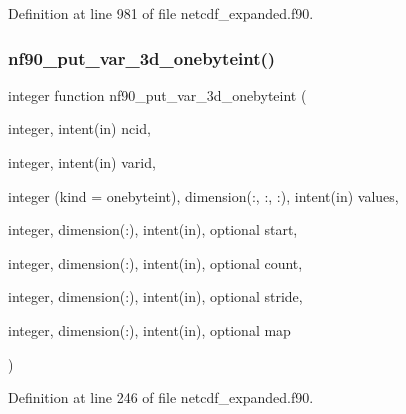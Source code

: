 Definition at line 981 of file netcdf\+\_\+expanded.\+f90.

\mbox{\label{netcdf__expanded_8f90_a96902a8b6f8705a9ae1e9f46aca673d9}} 
\subsubsection{\texorpdfstring{nf90\+\_\+put\+\_\+var\+\_\+3d\+\_\+onebyteint()}{nf90\_put\_var\_3d\_onebyteint()}}
{\footnotesize\ttfamily integer function nf90\+\_\+put\+\_\+var\+\_\+3d\+\_\+onebyteint (\begin{DoxyParamCaption}\item[{integer, intent(in)}]{ncid,  }\item[{integer, intent(in)}]{varid,  }\item[{integer (kind = onebyteint), dimension(\+:, \+:, \+:), intent(in)}]{values,  }\item[{integer, dimension(\+:), intent(in), optional}]{start,  }\item[{integer, dimension(\+:), intent(in), optional}]{count,  }\item[{integer, dimension(\+:), intent(in), optional}]{stride,  }\item[{integer, dimension(\+:), intent(in), optional}]{map }\end{DoxyParamCaption})}



Definition at line 246 of file netcdf\+\_\+expanded.\+f90.

\mbox{\label{netcdf__expanded_8f90_a50f2e70929414fb8cefa3699bac3a4d9}} 
